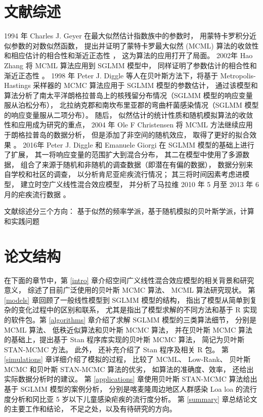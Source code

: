 \documentclass[12pt,a4paper,UTF8,twoside]{book}
\theoremstyle{definition}
\theoremstyle{definition}
\theoremstyle{definition}
\theoremstyle{remark}
\begin{document}
\hypertarget{reviews}{%
\section{文献综述}\label{reviews}}

1994 年 Charles J. Geyer 在最大似然估计指数族中的参数时，
用蒙特卡罗积分近似参数的对数似然函数， 提出并证明了蒙特卡罗最大似然
(MCML) 算法的收敛性和相应估计的相合性和渐近正态性 \citep{Geyer1994On}，
这为算法的应用打开了局面。 2002年 Hao Zhang 将 MCML 算法应用到 SGLMM
模型中， 同样证明了参数估计的相合性和渐近正态性 \citep{Zhang2002On}。
1998 年 Peter J. Diggle 等人在贝叶斯方法下，将基于 Metropolis-Hastings
采样器的 MCMC 算法应用于 SGLMM 模型的参数估计，
通过该模型和算法分析了南太平洋朗格拉普岛上的核残留分布情况（SGLMM
模型的响应变量服从泊松分布），
北拉纳克郡和南坎布里亚郡的弯曲杆菌感染情况（SGLMM
模型的响应变量服从二项分布）\citep{Diggle1998}。 随后，
似然估计的统计性质和随机模拟算法的收敛性和应用成为研究的重点， 2004 年
Ole F Christensen 将 MCML 方法继续应用于朗格拉普岛的数据分析，
但是添加了非空间的随机效应， 取得了更好的拟合效果
\citep{Christensen2004}。 2016年 Peter J. Diggle 和 Emanuele Giorgi 在
SGLMM 模型的基础上进行了扩展， 其一将响应变量的范围扩大到混合分布，
其二在模型中使用了多源数据，
组合了来源于随机和非随机的调查数据（即潜在有偏的数据），
数据分别来自学校和社区的调查， 以分析肯尼亚疟疾流行情况；
其三将时间因素考虑进模型， 建立时空广义线性混合效应模型， 并分析了马拉维
2010 年 5 月至 2013 年 6 月的疟疾流行数据 \citep{Diggle2016}。

文献综述分三个方向：
基于似然的频率学派，基于随机模拟的贝叶斯学派，计算和实践问题

\hypertarget{stracture}{%
\section{论文结构}\label{stracture}}

在下面的章节中，第 \ref{intro}
章介绍空间广义线性混合效应模型的相关背景和研究意义，
综述了目前广泛使用的贝叶斯 MCMC 算法、 MCML 算法研究现状。 第
\ref{models} 章回顾了一般线性模型到 SGLMM 模型的结构，
指出了模型从简单到复杂的变化过程中的区别和联系，
尤其是指出了模型求解的不同方法和基于 R 实现的软件包。第 \ref{algorithms}
章介绍了求解 SGLMM 模型的三类算法细节， 分别是 MCML 算法、
低秩近似算法和贝叶斯 MCMC 算法， 并在贝叶斯 MCMC 算法的基础上，提出基于
Stan 程序库实现的贝叶斯 MCMC 算法， 简记为贝叶斯 STAN-MCMC 方法。 此外，
还补充介绍了 Stan 程序及相关 R 包。 第 \ref{simulations}
章详细介绍了模拟的过程， 比较了 MCML、 Low-Rank、 贝叶斯 MCMC 和贝叶斯
STAN-MCMC 算法的优劣， 如算法的准确度、效率，
还给出实际数据分析时的建议。 第 \ref{applications} 章使用贝叶斯
STAN-MCMC 算法给出基于 SGLMM 模型的案例分析，
分别是喀麦隆周边地区人群感染 Loa loa 的流行度分析和冈比亚 5
岁以下儿童感染疟疾的流行度分析。 第 \ref{summary}
章总结论文的主要工作和结论， 不足之处，以及有待研究的方向。
\end{document}
